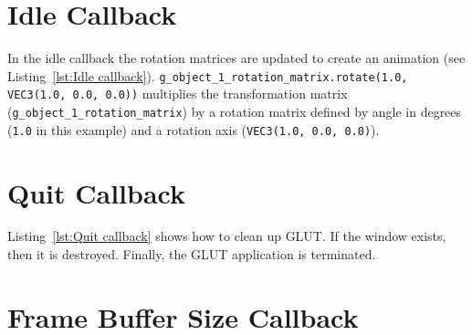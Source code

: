 \documentclass[11pt,oneside,a4paper,final]{article}
\begin{document}
\begin{center}

\end{center}


\section{Idle Callback}
\label{sec:Idle Callback}

In the idle callback the rotation matrices are updated to create an animation 
(see Listing~\ref{lst:Idle callback}). 
\verb+g_object_1_rotation_matrix.rotate(1.0, VEC3(1.0, 0.0, 0.0))+ multiplies 
the transformation matrix (\verb+g_object_1_rotation_matrix+) by a rotation 
matrix defined by angle in degrees (\verb+1.0+ in this example) and a rotation 
axis (\verb+VEC3(1.0, 0.0, 0.0)+).

\begin{center}

\end{center}

	
\section{Quit Callback}
\label{sec:Quit Callback}

Listing~\ref{lst:Quit callback} shows how to clean up GLUT. 
If the window exists, then it is destroyed. 
Finally, the GLUT application is terminated. 

\begin{center}

\end{center}


\section{Frame Buffer Size Callback}
\label{sec:frame buffer callback}
\end{document}
